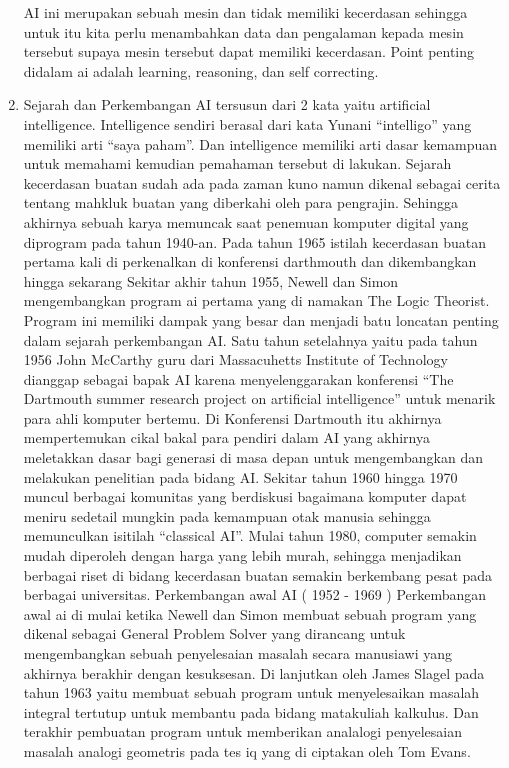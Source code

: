 \begin{enumerate}
    AI ini merupakan sebuah mesin dan tidak memiliki kecerdasan sehingga untuk itu kita perlu menambahkan data dan pengalaman kepada mesin tersebut supaya mesin tersebut dapat memiliki kecerdasan. Point penting didalam ai adalah learning, reasoning, dan self correcting.
	\item Sejarah dan Perkembangan
	\hfill\break
    AI tersusun dari 2 kata yaitu artificial intelligence. Intelligence sendiri berasal dari kata Yunani “intelligo” yang memiliki arti “saya paham”. Dan intelligence memiliki arti dasar kemampuan untuk memahami kemudian pemahaman tersebut di lakukan.
    Sejarah kecerdasan buatan sudah ada pada zaman kuno namun dikenal sebagai cerita tentang mahkluk buatan yang diberkahi oleh para pengrajin. Sehingga akhirnya sebuah karya memuncak saat penemuan komputer digital yang diprogram pada tahun 1940-an.
    Pada tahun 1965 istilah kecerdasan buatan pertama kali di perkenalkan di konferensi darthmouth dan dikembangkan hingga sekarang
    Sekitar akhir tahun 1955, Newell dan Simon mengembangkan program ai pertama yang di namakan The Logic Theorist. Program ini memiliki dampak yang besar dan menjadi batu loncatan penting dalam sejarah perkembangan  AI. Satu tahun setelahnya yaitu pada tahun 1956 John McCarthy guru dari Massacuhetts Institute of Technology dianggap sebagai bapak AI karena menyelenggarakan konferensi “The Dartmouth summer research project on artificial intelligence” untuk menarik para ahli komputer bertemu.  Di Konferensi Dartmouth itu akhirnya mempertemukan cikal bakal para pendiri dalam AI yang akhirnya  meletakkan dasar bagi generasi di masa depan untuk  mengembangkan dan melakukan penelitian pada bidang AI. Sekitar  tahun 1960 hingga 1970 muncul berbagai komunitas yang berdiskusi bagaimana komputer dapat meniru sedetail mungkin pada kemampuan otak manusia sehingga memunculkan isitilah “classical AI”. Mulai tahun 1980, computer semakin mudah diperoleh dengan harga yang lebih murah, sehingga menjadikan berbagai riset di bidang kecerdasan buatan semakin berkembang pesat pada berbagai universitas.
    Perkembangan awal AI ( 1952 - 1969 )
    Perkembangan awal ai di mulai ketika Newell dan Simon membuat sebuah program yang dikenal sebagai General Problem Solver yang dirancang untuk mengembangkan sebuah penyelesaian masalah secara manusiawi yang akhirnya berakhir dengan kesuksesan.
    Di lanjutkan oleh James Slagel pada tahun 1963 yaitu membuat sebuah program untuk menyelesaikan masalah integral tertutup untuk membantu pada bidang matakuliah kalkulus.
    Dan terakhir pembuatan program untuk memberikan analalogi penyelesaian masalah analogi geometris pada tes iq yang di ciptakan oleh Tom Evans.

\end{enumerate}
